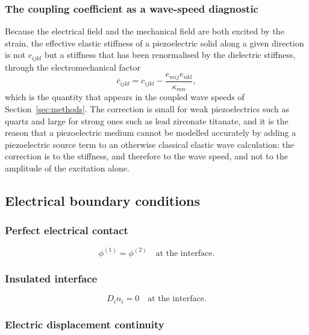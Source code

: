 \subsubsection{The coupling coefficient as a wave-speed diagnostic}

Because the electrical field and the mechanical field are both excited by the strain, the effective elastic stiffness of a piezoelectric solid along a given direction is not $c_{ijkl}$ but a stiffness that has been renormalised by the dielectric stiffness, through the electromechanical factor
\begin{equation}
\bar{c}_{ijkl} = c_{ijkl} - \frac{e_{mij}e_{nkl}}{\kappa_{mn}},
\label{eq:5.19}
\end{equation}
which is the quantity that appears in the coupled wave speeds of Section~\ref{sec:methods}. The correction is small for weak piezoelectrics such as quartz and large for strong ones such as lead zirconate titanate, and it is the reason that a piezoelectric medium cannot be modelled accurately by adding a piezoelectric source term to an otherwise classical elastic wave calculation: the correction is to the stiffness, and therefore to the wave speed, and not to the amplitude of the excitation alone.

\subsection{Electrical boundary conditions}
\label{sec:5.3}

\subsubsection{Perfect electrical contact}

\begin{equation}
\phi^{(1)} = \phi^{(2)} \quad \text{at the interface}.
\label{eq:5.11}
\end{equation}

\subsubsection{Insulated interface}

\begin{equation}
D_i n_i = 0 \quad \text{at the interface}.
\label{eq:5.12}
\end{equation}

\subsubsection{Electric displacement continuity}


